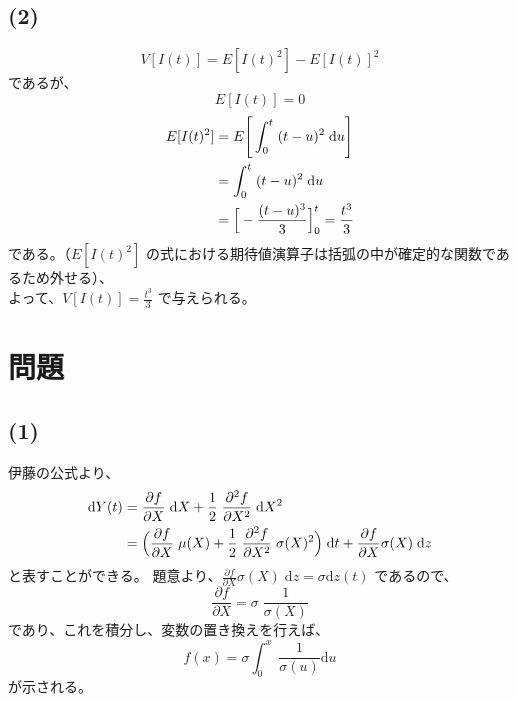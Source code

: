 \documentclass[a4j,10pt,oneside,openany]{jsbook}
\newcommand{\diff}{\mathrm{d}}  %
\begin{document}
\subsection*{(2)}
\[ V[I(t)] = E[I(t)^2] - E[I(t)]^2 \]
であるが、
\[ E[I(t)] = 0 \]
\begin{align*}
E[I(t)^2]	&= E \Bigg{[} \int ^{t}_{0} \; (t-u)^2 \; {\diff}u \Bigg{]} \\
		&= \int ^{t}_{0} \; (t-u)^2 \; {\diff}u \\
		&= \Big{[} - \frac{(t-u)^3}{3} \Big{]}^{t}_{0} = \frac{t^3}{3}
\end{align*}
である。（$E[I(t)^2]$ の式における期待値演算子は括弧の中が確定的な関数であるため外せる）、\\
よって、$V[I(t)] = \frac{t^3}{3}$ で与えられる。
\vspace{2\baselineskip}

\section*{問題 }
\subsection*{(1)}
伊藤の公式より、
\begin{align*}
{\diff}Y(t)		&= \frac{\partial f}{\partial X} \; {\diff}X + \frac{1}{2} \; \frac{{\partial} ^{2} f}{{\partial} X^2} \; {\diff}X^2 \\
			&= \Big{(} \frac{\partial f}{\partial X} \; {\mu}(X) + \frac{1}{2} \; \frac{{\partial} ^{2} f}{{\partial} X^2} \; {\sigma}(X)^2
				\Big{)} \; {\diff}t + \frac{\partial f}{\partial X} {\sigma}(X) \; {\diff}z
\end{align*}
と表すことができる。
題意より、$\frac{\partial f}{\partial X} {\sigma}(X) \; {\diff}z = \sigma {\diff}z(t)$ であるので、
\[ \frac{\partial f}{\partial X} = {\sigma} \; \frac{1}{{\sigma}(X)}\]
であり、これを積分し、変数の置き換えを行えば、
\[ f(x) = {\sigma} \int^{x}_{0} \; \frac{1}{\sigma (u)} {\diff}u \]
が示される。
\end{document}
